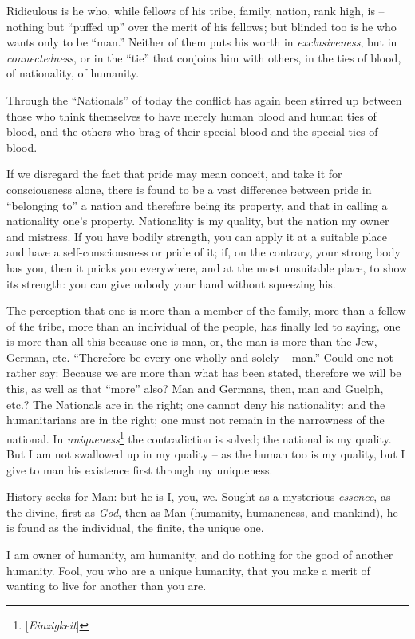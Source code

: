 Ridiculous is he who, while fellows of his tribe, family, nation, rank high, 
is -- nothing but ``puffed up'' over the merit of his fellows; but blinded 
too is he who wants only to be ``man.'' Neither of them puts his worth in 
\textit{exclusiveness}, but in \textit{connectedness}, or in the ``tie'' 
that conjoins him with others, in the ties of blood, of nationality, of 
humanity.

Through the ``Nationals'' of today the conflict has again been stirred up 
between those who think themselves to have merely human blood and human ties 
of blood, and the others who brag of their special blood and the special ties 
of blood.

If we disregard the fact that pride may mean conceit, and take it for 
consciousness alone, there is found to be a vast difference between pride in 
``belonging to'' a nation and therefore being its property, and that in 
calling a nationality one's property. Nationality is my quality, but the 
nation my owner and mistress. If you have bodily strength, you can apply it at 
a suitable place and have a self-consciousness or pride of it; if, on the 
contrary, your strong body has you, then it pricks you everywhere, and at the 
most unsuitable place, to show its strength: you can give nobody your hand 
without squeezing his.

The perception that one is more than a member of the family, more than a 
fellow of the tribe, more than an individual of the people, has finally led to 
saying, one is more than all this because one is man, or, the man is more than 
the Jew, German, etc. ``Therefore be every one wholly and solely -- man.'' 
Could one not rather say: Because we are more than what has been stated, 
therefore we will be this, as well as that ``more'' also? Man and Germans, 
then, man and Guelph, etc.? The Nationals are in the right; one cannot deny 
his nationality: and the humanitarians are in the right; one must not remain 
in the narrowness of the national. In 
\textit{uniqueness}\footnote{[\textit{Einzigkeit}]} the contradiction is 
solved; the national is my quality. But I am not swallowed up in my quality -- 
as the human too is my quality, but I give to man his existence first through 
my uniqueness.

History seeks for Man: but he is I, you, we. Sought as a mysterious 
\textit{essence}, as the divine, first as \textit{God}, then as Man (humanity, 
humaneness, and mankind), he is found as the individual, the finite, the 
unique one.

I am owner of humanity, am humanity, and do nothing for the good of another 
humanity. Fool, you who are a unique humanity, that you make a merit of 
wanting to live for another than you are.

